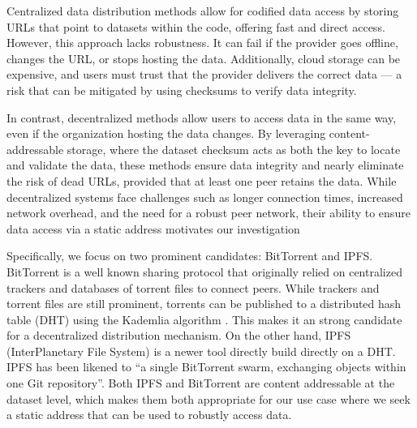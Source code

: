\documentclass{article}
\begin{document}
Centralized data distribution methods allow for codified data access by storing URLs that point to datasets
  within the code, offering fast and direct access.
However, this approach lacks robustness.
It can fail if the provider goes offline, changes the URL, or stops hosting the data.
Additionally, cloud storage can be expensive, and users must trust that the provider delivers the correct
  data --- a risk that can be mitigated by using checksums to verify data integrity.

In contrast, decentralized methods allow users to access data in the same way, even if the organization
  hosting the data changes.
By leveraging content-addressable storage, where the dataset checksum acts as both the key to locate and
  validate the data, these methods ensure data integrity and nearly eliminate the risk of dead URLs, provided
  that at least one peer retains the data.
While decentralized systems face challenges such as longer connection times, increased network overhead, and
  the need for a robust peer network, their ability to ensure data access via a static address
  motivates our investigation

Specifically, we focus on two prominent candidates:
BitTorrent and IPFS.
BitTorrent \cite{cohen_incentives_2003, cohen_bittorrent_2017} is a well known sharing protocol that
  originally relied on centralized trackers and databases of torrent files to connect peers.
While trackers and torrent files are still prominent, torrents can be published to a distributed hash table
  (DHT) using the Kademlia algorithm \cite{maymounkov_kademlia_2002}.
This makes it an strong candidate for a decentralized distribution mechanism.
On the other hand, IPFS (InterPlanetary File System) \cite{benet_ipfs_2014, bieri_overview_2021} is a newer
  tool directly build directly on a DHT.
IPFS has been likened to ``a single BitTorrent swarm, exchanging objects within one Git repository''.
Both IPFS and BitTorrent are content addressable at the dataset level, which makes them both appropriate for
  our use case where we seek a static address that can be used to robustly access data.
\end{document}
